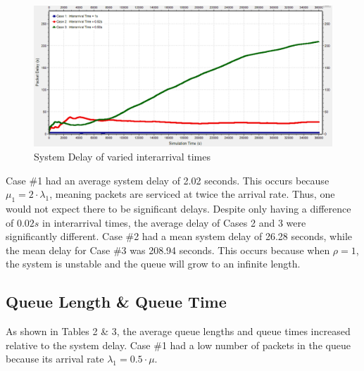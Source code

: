\documentclass{article}
\begin{document}
\begin{figure}[h!]
	\begin{center}
	\includegraphics[scale=0.65]{Images/DelayPlot.PNG}
	\vspace{-.25cm}
	\caption{System Delay of varied interarrival times}
	\label{DelayPlot}
	\end{center}
\end{figure}

Case \#1 had an average system delay of 2.02 seconds.  This occurs because $\mu_1 = 2 \cdot \lambda_1$, meaning packets are serviced at twice the arrival rate.
Thus, one would not expect there to be significant delays.
Despite only having a difference of $0.02s$ in interarrival times, the average delay of Cases 2 and 3 were significantly different. Case \#2 had a mean system delay of 26.28 seconds, while the mean delay for Case \#3 was 208.94 seconds.  
This occurs because when $\rho = 1$, the system is unstable and the queue will grow to an infinite length.

\subsection*{Queue Length \& Queue Time}
As shown in Tables 2 \& 3, the average queue lengths and queue times increased relative to the system delay.  
Case \#1 had a low number of packets in the queue because its arrival rate $\lambda_1 = 0.5 \cdot \mu$.
\end{document}
